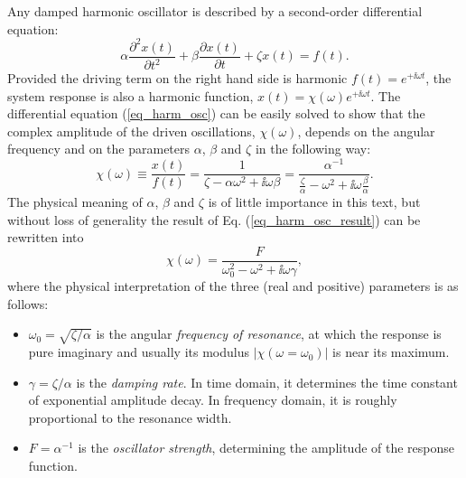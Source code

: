 Any damped harmonic oscillator is described by a second-order differential equation:
\begin{equation} \alpha \frac{\partial^{2} x(t)}{\partial t^{2}} + \beta\frac{\partial x(t)}{\partial t} + \zeta x(t) = f(t). \label{eq_harm_osc}\end{equation}
Provided the driving term on the right hand side  is harmonic $f(t) = e^{+\ii \omega t}$, the system response is also a harmonic function, $x(t) = \chi(\omega) e^{+\ii \omega t}$. The differential equation (\ref{eq_harm_osc}) can be easily solved to show that the complex amplitude of the driven oscillations, $\chi(\omega)$, depends on the angular frequency and on the parameters $\alpha$, $\beta$ and $\zeta$ in the following way:
\begin{equation} \chi(\omega) \equiv \frac{x(t)}{f(t)} = \frac{1}{\zeta-\alpha\omega^{2} + \ii\omega\beta}  = \frac{\alpha^{-1}}{\frac{\zeta}{\alpha}-\omega^{2} + \ii\omega\frac{\beta}{\alpha}}. \label{eq_harm_osc_result}\end{equation}
The physical meaning of $\alpha$, $\beta$ and $\zeta$ is of little importance in this text, but without loss of generality the result of Eq. (\ref{eq_harm_osc_result}) can be rewritten into
\begin{equation} \chi(\omega) = \frac{F}{\omega_0^{2}-\omega^{2} + \ii\omega\gamma}, \label{eq_harm_osc_rewritten}\end{equation}
where the physical interpretation of the three (real and positive) parameters is as follows:
\begin{itemize}
 \item{$\omega_0 = \sqrt{\zeta/\alpha}$ is the angular \textit{frequency of resonance}, at which the response is pure imaginary and usually its modulus $|\chi(\omega=\omega_0)|$ is near its maximum.} 
 \item{$\gamma = \zeta/\alpha$ is the \textit{damping rate}. In time domain, it determines the time constant of exponential amplitude decay. In frequency domain, it is roughly proportional to the resonance width. } 
 \item{$F = \alpha^{-1}$ is the \textit{oscillator strength}, determining the amplitude of the response function.}
 \end{itemize}

